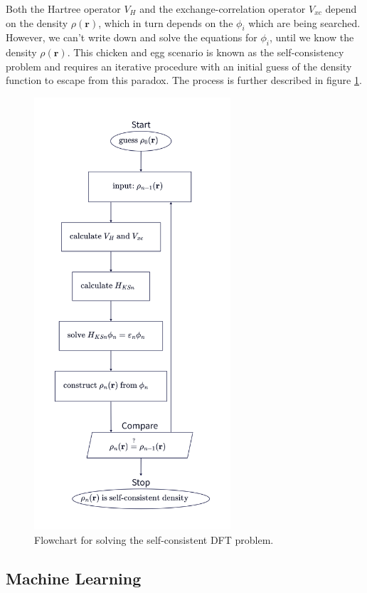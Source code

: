 Both the Hartree operator $V_H$ and the exchange-correlation operator $V_{xc}$
depend on the density $\rho(\mathbf{r})$, which in turn depends on the
$\phi_i$ which are being searched. However, we can't write down and solve the
equations for $\phi_i$, until we know the density $\rho(\mathbf{r})$. This
chicken and egg scenario is known as the self-consistency problem and requires
an iterative procedure with an initial guess of the density function to escape
from this paradox. The process is further described in figure
\ref{fig:self-consistency}.

\begin{figure}
  \begin{center}
    \includegraphics[width=7.3cm]{image/self_consistency}
  \end{center}
  \caption{Flowchart for solving the self-consistent DFT problem.}
  \label{fig:self-consistency}
\end{figure}

\subsection{Machine Learning}

